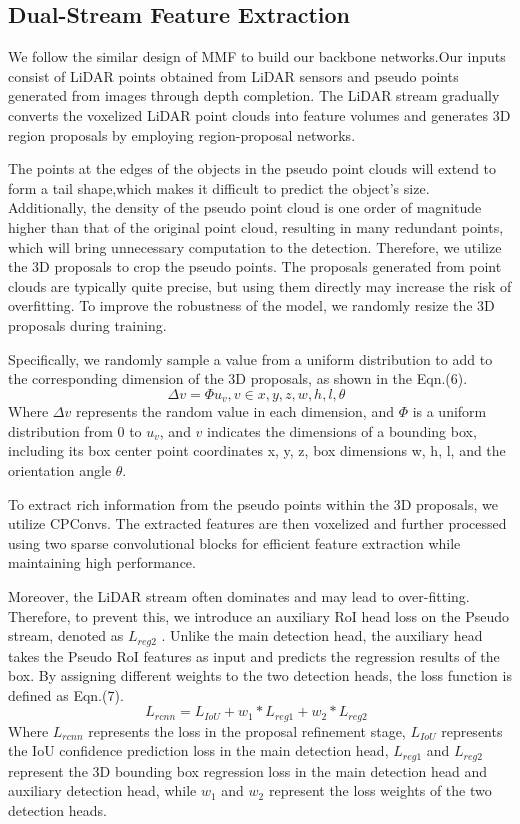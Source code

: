 \begin{sloppypar}
\subsection{Dual-Stream Feature Extraction}
We follow the similar design of MMF\cite{33} to build our backbone networks.Our inputs consist of LiDAR points obtained from LiDAR sensors and pseudo points generated from images through depth completion. The LiDAR stream gradually converts the voxelized LiDAR point clouds into feature volumes and generates 3D region proposals by employing region-proposal networks.

The points at the edges of the objects in the pseudo point clouds will extend to form a tail shape,which makes it difficult to predict the object's size. Additionally, the density of the pseudo point cloud is one order of magnitude higher than that of the original point cloud, resulting in many redundant points, which will bring unnecessary computation to the detection. Therefore, we utilize the 3D proposals to crop the pseudo points. The proposals generated from point clouds are typically quite precise, but using them directly may increase the risk of overfitting. To improve the robustness of the model, we randomly resize the 3D proposals during training.

Specifically, we randomly sample a value from a uniform distribution to add to the corresponding dimension of the 3D proposals, as shown in the Eqn.(6).
\begin{equation}
\Delta v =  \Phi{u_v},v\in{x,y,z,w,h,l,\theta} \enspace
\end{equation}
Where $\Delta v$  represents the random value in each dimension, and $\Phi$ is a uniform distribution from 0 to $u_v$, and $v$ indicates the dimensions of a bounding box, including its box center point coordinates x, y, z, box dimensions w, h, l, and the orientation angle $\theta$.

To extract rich information from the pseudo points within the 3D proposals, we utilize CPConvs\cite{14}. The extracted features are then voxelized and further processed using two sparse convolutional blocks for efficient feature extraction while maintaining high performance.

Moreover, the LiDAR stream often dominates and may lead to over-fitting. Therefore, to prevent this, we introduce an auxiliary RoI head loss on the Pseudo stream, denoted as $L_{reg2}$ . Unlike the main detection head, the auxiliary head takes the Pseudo RoI features as input and predicts the regression results of the box. By assigning different weights to the two detection heads, the loss function is defined as Eqn.(7).
\begin{equation}
L_{rcnn} = L_{IoU} + w_1*L_{reg1} + w_2*L_{reg2} \enspace
\end{equation}
Where $L_{rcnn}$ represents the loss in the proposal refinement stage, $L_{IoU}$ represents the IoU confidence prediction loss in the main detection head, $L_{reg1}$ and $L_{reg2}$ represent the 3D bounding box regression loss in the main detection head and auxiliary detection head, while $w_1$ and $w_2$ represent the loss weights of the two detection heads.


\end{sloppypar}
